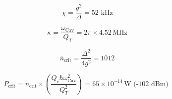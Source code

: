 \documentclass[12pt,reqno]{amsart}
\begin{document}
\begin{equation}
\chi = \frac{g^2}{\Delta} = 52 \, \, \text{kHz}
\end{equation}

\begin{equation}
\kappa = \frac{\omega_\text{Cav}}{Q_T} = 2\pi \times 4.52 \, \text{MHz}
\end{equation}

\begin{equation}
\bar{n}_\text{crit} = \frac{\Delta^2}{4g^2} = 1012
\end{equation}

\begin{equation}
P_\text{crit} = \bar{n}_\text{crit} \times \left( \frac{ Q_c \hbar \omega_\text{Cav}^2}{Q_T^2} \right) = 65\times 10^{-14} \, \text{W  (-102 dBm) }
\end{equation}
\end{document}
